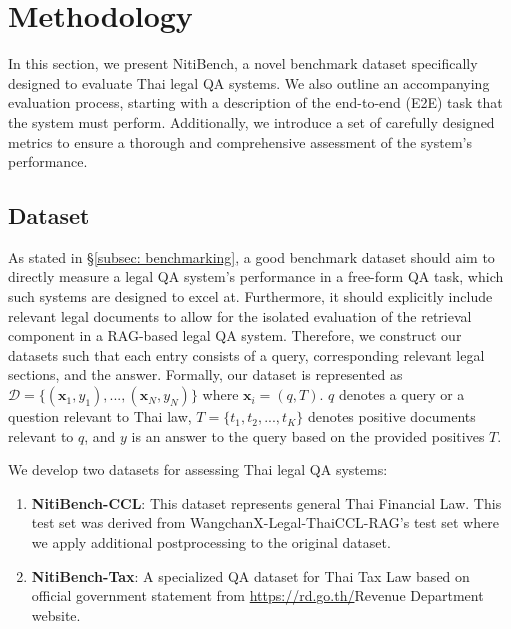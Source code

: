 \section{Methodology}

In this section, we present NitiBench, a novel benchmark dataset specifically designed to evaluate Thai legal QA systems. 
%
We also outline an accompanying evaluation process, starting with a description of the end-to-end (E2E) task that the system must perform. 
%
Additionally, we introduce a set of carefully designed metrics to ensure a thorough and comprehensive assessment of the system's performance.

\subsection{Dataset}
\label{subsec: dataset}

As stated in \S\ref{subsec: benchmarking}, a good benchmark dataset should aim to directly measure a legal QA system's performance in a free-form QA task, which such systems are designed to excel at. 
%
Furthermore, it should explicitly include relevant legal documents to allow for the isolated evaluation of the retrieval component in a RAG-based legal QA system.
%
Therefore, we construct our datasets such that each entry consists of a query, corresponding relevant legal sections, and the answer. 
%
Formally, our dataset is represented as $\mathcal{D} = \{(\textbf{x}_1, y_1), ..., (\textbf{x}_N, y_N)\}$ where $\textbf{x}_i = (q, T)$. $q$ denotes a query or a question relevant to Thai law, $T = \{t_1, t_2, ..., t_K\}$ denotes positive documents relevant to $q$, and $y$ is an answer to the query based on the provided positives $T$.


We develop two datasets for assessing Thai legal QA systems: 
\begin{enumerate}
    \item {\textbf{NitiBench-CCL}}: This dataset represents general Thai Financial Law.
    This test set was derived from WangchanX-Legal-ThaiCCL-RAG's test set where we apply additional postprocessing to the original dataset.
    \item {\textbf{NitiBench-Tax}}: A specialized QA dataset for Thai Tax Law based on official government statement from \url{https://rd.go.th/}{Revenue Department website}.
\end{enumerate}

